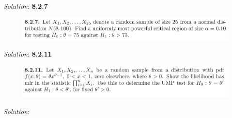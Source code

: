 \documentclass{book}
\theoremstyle{definition}
\begin{document}
\noindent\textit{Solution}:
\newpage
\noindent\textbf{8.2.7}
\begin{figure}[!htb]
	\centering
	\includegraphics[scale=0.5]{827}
\end{figure}

\noindent\textit{Solution}:
\newpage
\noindent\textbf{8.2.11}
\begin{figure}[!htb]
	\centering
	\includegraphics[scale=0.5]{8211}
\end{figure}

\noindent\textit{Solution}:
\newpage




\newpage

	
	
\end{document}
